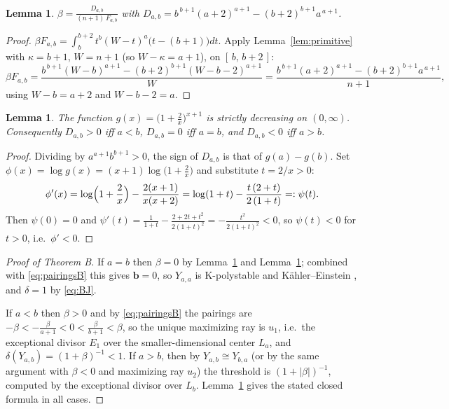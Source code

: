 \documentclass[11pt]{amsart}
\newtheorem{lemma}[theorem]{Lemma}
\theoremstyle{definition}
\theoremstyle{remark}
\begin{document}
\begin{lemma}\label{lem:closedbetaB}
$\displaystyle
\beta=\frac{D_{a,b}}{(n+1)\,F_{a,b}}$ with
$D_{a,b}=b^{\,b+1}(a+2)^{a+1}-(b+2)^{b+1}a^{\,a+1}$.
\end{lemma}

\begin{proof}
$\beta F_{a,b}=\int_b^{b+2}t^{b}(W-t)^{a}\bigl(t-(b+1)\bigr)dt$. Apply
Lemma~\ref{lem:primitive} with $\kappa=b+1$, $W=n+1$ (so
$W-\kappa=a+1$), on $[\,b,\,b+2\,]$:
\[
\beta F_{a,b}
=\frac{b^{\,b+1}(W-b)^{a+1}-(b+2)^{b+1}(W-b-2)^{a+1}}{W}
=\frac{b^{\,b+1}(a+2)^{a+1}-(b+2)^{b+1}a^{\,a+1}}{n+1},
\]
using $W-b=a+2$ and $W-b-2=a$.
\end{proof}

\begin{lemma}\label{lem:sign}
The function $g(x)=\bigl(1+\tfrac2x\bigr)^{x+1}$ is strictly decreasing
on $(0,\infty)$. Consequently $D_{a,b}>0$ iff $a<b$, $D_{a,b}=0$ iff
$a=b$, and $D_{a,b}<0$ iff $a>b$.
\end{lemma}

\begin{proof}
Dividing by $a^{a+1}b^{b+1}>0$, the sign of $D_{a,b}$ is that of
$g(a)-g(b)$. Set $\phi(x)=\log g(x)=(x+1)\log\bigl(1+\tfrac2x\bigr)$
and substitute $t=2/x>0$:
\[
\phi'(x)=\log\Bigl(1+\frac2x\Bigr)-\frac{2(x+1)}{x(x+2)}
=\log(1+t)-\frac{t\,(2+t)}{2\,(1+t)}=:\psi(t).
\]
Then $\psi(0)=0$ and
$\psi'(t)=\frac1{1+t}-\frac{2+2t+t^2}{2(1+t)^2}
=-\frac{t^2}{2(1+t)^2}<0$, so $\psi(t)<0$ for $t>0$, i.e.\ $\phi'<0$.
\end{proof}

\begin{proof}[Proof of Theorem B]
If $a=b$ then $\beta=0$ by Lemma~\ref{lem:closedbetaB} and
Lemma~\ref{lem:sign}; combined with \eqref{eq:pairingsB} this gives
$\mathbf b=0$, so $Y_{a,a}$ is K-polystable and K\"ahler--Einstein
\cite{WZ04,BB13,Berman16}, and $\delta=1$ by \eqref{eq:BJ}.

If $a<b$ then $\beta>0$ and by \eqref{eq:pairingsB} the pairings are
$-\beta<-\tfrac{\beta}{a+1}<0<\tfrac{\beta}{b+1}<\beta$, so the unique
maximizing ray is $u_1$, i.e.\ the exceptional divisor $E_1$ over the
smaller-dimensional center $L_a$, and
$\delta(Y_{a,b})=(1+\beta)^{-1}<1$. If $a>b$, then by
$Y_{a,b}\cong Y_{b,a}$ (or by the same argument with $\beta<0$ and
maximizing ray $u_2$) the threshold is $(1+|\beta|)^{-1}$, computed by
the exceptional divisor over $L_b$. Lemma~\ref{lem:closedbetaB} gives
the stated closed formula in all cases.
\end{proof}
\end{document}
